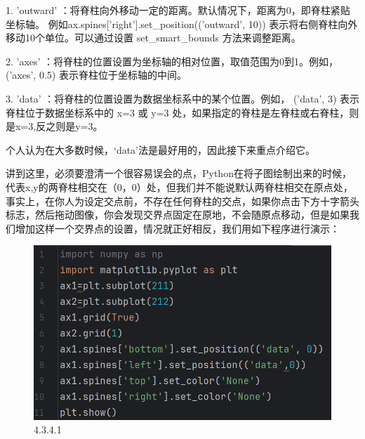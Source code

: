 \documentclass[12pt]{article}
\begin{document}
1.   'outward'  ：将脊柱向外移动一定的距离。默认情况下，距离为0，即脊柱紧贴坐标轴。 例如ax.spines['right'].set\_position(('outward', 10)) 表示将右侧脊柱向外移动10个单位。可以通过设置   set\_smart\_bounds   方法来调整距离。

2.   'axes'  ：将脊柱的位置设置为坐标轴的相对位置，取值范围为0到1。例如，  ('axes', 0.5)   表示脊柱位于坐标轴的中间。

3.   'data'  ：将脊柱的位置设置为数据坐标系中的某个位置。例如，  ('data', 3)   表示脊柱位于数据坐标系中的 x=3 或 y=3 处，如果指定的脊柱是左脊柱或右脊柱，则是x=3,反之则是y=3。

个人认为在大多数时候，‘data’法是最好用的，因此接下来重点介绍它。

讲到这里，必须要澄清一个很容易误会的点，Python在将子图绘制出来的时候，代表x,y的两脊柱相交在（0，0）处，但我们并不能说默认两脊柱相交在原点处，事实上，在你人为设定交点前，不存在任何脊柱的交点，如果你点击下方十字箭头标志，然后拖动图像，你会发现交界点固定在原地，不会随原点移动，但是如果我们增加这样一个交界点的设置，情况就正好相反，我们用如下程序进行演示：
\begin{figure}[H]
    \centering
    \includegraphics[width=0.6\linewidth]{脊柱设置 program1.png}
    \caption{4.3.4.1}
    \label{fig:enter-label}
\end{figure}
\end{document}
